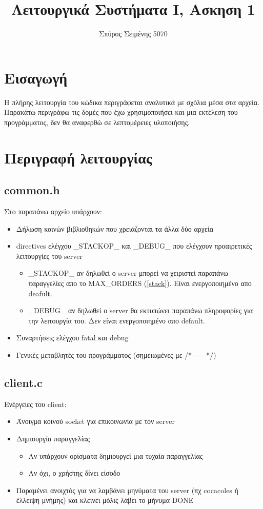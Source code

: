 \documentclass{article}
\title{Λειτουργικά Συστήματα Ι, Ασκηση 1}
\author{Σπύρος Σειμένης 5070}
\begin{document}
\maketitle

\section{Εισαγωγή}
Η πλήρης λειτουργία του κώδικα περιγράφεται αναλυτικά με σχόλια μέσα στα αρχεία. Παρακάτω περιγράφω τις δομές που έχω χρησιμοποιήσει και μια εκτέλεση του προγράμματος, δεν θα αναφερθώ σε λεπτομέρειες υλοποιήσης.

\section{Περιγραφή λειτουργίας}
\subsection{common.h}
Στο παραπάνω αρχείο υπάρχουν:
\begin{itemize}
 \item Δήλωση κοινών βιβλιοθηκών που χρειάζονται τα άλλα δύο αρχεία
 \item directives ελέγχου \_STACKOP\_ και \_DEBUG\_ που ελέγχουν προαιρετικές λειτουργίες του server
 \begin{itemize}
  \item \_STACKOP\_ αν δηλωθεί ο server μπορεί να χειριστεί παραπάνω παραγγελίες απο το MAX\_ORDERS (\ref{stack}). Είναι ενεργοποιημένο απο deafult.
  \item \_DEBUG\_ αν δηλωθεί ο server θα εκτυπώνει παραπάνω πληροφορίες για την λειτουργία του. Δεν είναι ενεργοποιημένο απο default.
 \end{itemize}
 \item Συναρτήσεις ελέγχου fatal και debug
 \item Γενικές μεταβλητές του προγράμματος (σημειωμένες με /*------*/)
\end{itemize}

\subsection{client.c}
Ενέργειες του client:
\begin{itemize}
 \item Άνοιγμα κοινού socket για επικοινωνία με τον server
 \item Δημιουργία παραγγελίας
 \begin{itemize}
 \item Αν υπάρχουν ορίσματα δημιουργεί μια τυχαία παραγγελίας
 \item Αν όχι, ο χρήστης δίνει είσοδο
 \end{itemize}
 \item Παραμένει ανοιχτός για να λαμβάνει μηνύματα του server (πχ cocacoles ή έλλειψη μνήμης) και κλείνει μόλις λάβει το μήνυμα DONE 
\end{itemize}
\pagebreak
\end{document}
